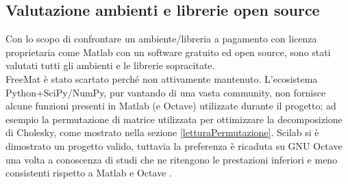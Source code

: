 \subsection{Valutazione ambienti e librerie open source}\label{ambienti_valutazione}
Con lo scopo di confrontare un ambiente/libreria a pagamento con licenza proprietaria come Matlab con
un software gratuito ed open source, sono stati valutati tutti gli ambienti e le librerie sopracitate.\\
FreeMat è stato scartato perché non attivamente mantenuto.
L'ecosistema Python+SciPy/NumPy, pur vantando di una vasta community, non fornisce alcune funzioni presenti in Matlab (e Octave)
utilizzate durante il progetto; ad esempio la permutazione di matrice utilizzata per ottimizzare la decomposizione di Cholesky, come mostrato nella sezione \ref{letturaPermutazione}.
Scilab si è dimostrato un progetto valido, tuttavia la preferenza è ricaduta su GNU Octave una volta a conoscenza di studi che ne ritengono le prestazioni inferiori e meno consistenti rispetto a Matlab e Octave \cite{matlab_octave_scilab_comp:1}. 
